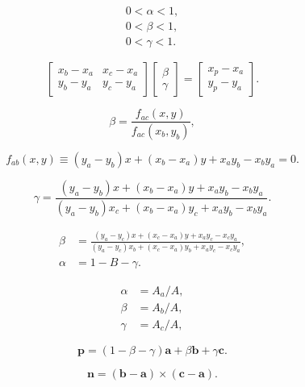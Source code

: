 \[
  \begin{array}{c}{{0<\alpha<1,}}\\ {{0<\beta<1,}}\\ {{0<\gamma<1.}}\end{array}
\]

\begin{equation}
  \begin{bmatrix}
    x_b-x_a & x_c-x_a \\
    y_b-y_a & y_c-y_a
  \end{bmatrix}
  \begin{bmatrix}
    \beta \\
    \gamma
  \end{bmatrix}=
  \begin{bmatrix}
    x_p-x_a \\
    y_p-y_a
  \end{bmatrix}.
\end{equation}

\begin{equation}
  \beta=\frac{f_{a c}(x,y)}{f_{a c}(x_{b},y_{b})},
\end{equation}

\[
  f_{a b}(x,y)\equiv(y_{a}-y_{b})x+(x_{b}-x_{a})y+x_{a}y_{b}-x_{b}y_{a}=0.
\]

\[
  \gamma=\frac{(y_{a}-y_{b})x+(x_{b}-x_{a})y+x_{a}y_{b}-x_{b}y_{a}}{(y_{a}-y_{b})x_{c}+(x_{b}-x_{a})y_{c}+x_{a}y_{b}-x_{b}y_{a}}.
\]

\[
  \begin{aligned}
    \beta  & =\frac{(y_{a}-y_{c})x+(x_{c}-x_{a})y+x_{a}y_{c}-x_{c}y_{a}}{(y_{a}-y_{c})x_{b}+(x_{c}-x_{a})y_{b}+x_{a}y_{c}-x_{c}y_{a}}, \\
    \alpha & =1-B-\gamma.
  \end{aligned}
\]

\begin{equation}
  \begin{aligned}
    \alpha & =A_{a}/A, \\
    \beta  & =A_{b}/A, \\
    \gamma & =A_{c}/A,
  \end{aligned}
\end{equation}

\[
  \mathbf{p}=(1-\beta-\gamma)\mathbf{a}+\beta\mathbf{b}+\gamma\mathbf{c}.
\]

\begin{equation}
  \mathbf{n}=(\mathbf{b}-\mathbf{a})\times(\mathbf{c}-\mathbf{a}).
\end{equation}


